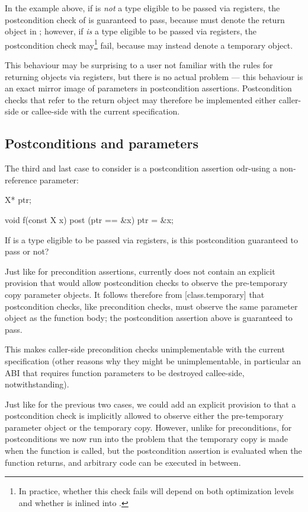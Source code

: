 In the example above, if  is \emph{not} a type eligible to be passed via registers, the postcondition check of  is guaranteed to pass, because  must denote the return object  in ; however, if  \emph{is} a type eligible to be passed via registers, the postcondition check may\footnote{In practice, whether this check fails will depend on both optimization levels and whether  is inlined into .} fail, because  may instead denote a temporary object.

This behaviour may be surprising to a user not familiar with the rules for returning objects via registers, but there is no actual problem --- this behaviour is an exact mirror image of parameters in postcondition assertions. Postcondition checks that refer to the return object may therefore be implemented either caller-side or callee-side with the current specification.

\subsection{Postconditions and parameters}

The third and last case to consider is a postcondition assertion odr-using a non-reference parameter:

\begin{codeblock}
X* ptr;

void f(const X x) post (ptr == &x) {
  ptr = &x;
}
\end{codeblock}

If  is a type eligible to be passed via registers, is this postcondition guaranteed to pass or not?

Just like for precondition assertions, \cite{P2900R10} currently does not contain an explicit provision that would allow postcondition checks to observe the pre-temporary copy parameter objects. It follows therefore from [class.temporary] that postcondition checks, like precondition checks, must observe the same parameter object as the function body; the postcondition assertion above is guaranteed to pass.

This makes caller-side precondition checks unimplementable with the current specification (other reasons why they might be unimplementable, in particular an ABI that requires function parameters to be destroyed callee-side, notwithstanding).

Just like for the previous two cases, we could add an explicit provision to \cite{P2900R10} that a postcondition check is implicitly allowed to observe either the pre-temporary parameter object or the temporary copy. However, unlike for preconditions, for postconditions we now run into the problem that the temporary copy is made when the function is called, but the postcondition assertion is evaluated when the function returns, and arbitrary code can be executed in between. 

